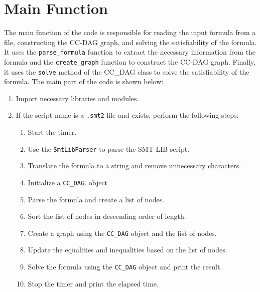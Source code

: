 \documentclass[11pt]{report}
\begin{document}
\newpage
\section*{Main Function}
The main function of the code is responsible for reading the input formula from a file, constructing the CC-DAG graph, and solving the satisfiability of the formula. It uses the \texttt{parse\_formula} function to extract the necessary information from the formula and the \texttt{create\_graph} function to construct the CC-DAG graph. Finally, it uses the \texttt{solve} method of the CC\_DAG class to solve the satisfiability of the formula.
The main part of the code is shown below:
\begin{enumerate}
    \item Import necessary libraries and modules.
    
    \item If the script name is a \texttt{.smt2} file and exists, perform the following steps:
    \begin{enumerate}
        \item Start the timer.
        
        \item Use the \texttt{SmtLibParser} to parse the SMT-LIB script.
        
        \item Translate the formula to a string and remove unnecessary characters.
        
        \item Initialize a \texttt{CC\_DAG}. object
        
        \item Parse the formula and create a list of nodes.
        
        \item Sort the list of nodes in descending order of length.
        
        \item Create a graph using the \texttt{CC\_DAG} object and the list of nodes.
        
        \item Update the equalities and inequalities based on the list of nodes.
        
        \item Solve the formula using the \texttt{CC\_DAG} object and print the result.
        
        \item Stop the timer and print the elapsed time.
    \end{enumerate}
    

\end{enumerate}
\end{document}
